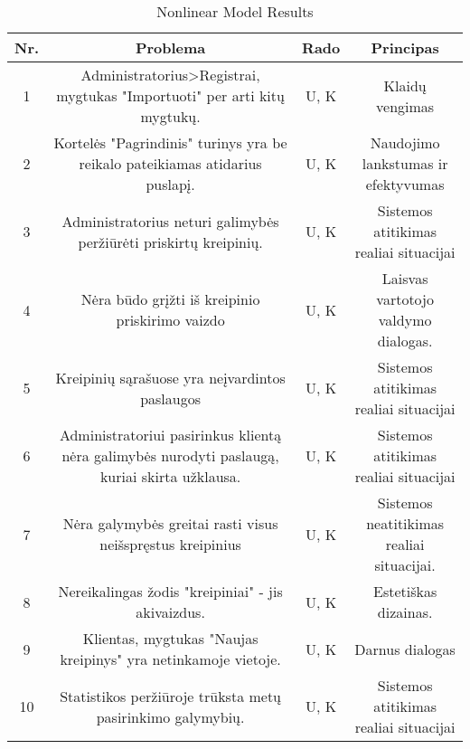 	\begin{table}[ht] 
	\caption{Nonlinear Model Results} %
	\centering %
	\begin{tabular}{c c c c} %
	\hline\hline %
	Nr. & Problema & Rado & Principas \\ [0.5ex] %
	\hline %
	1 & Administratorius>Registrai, mygtukas "Importuoti" per arti kitų mygtukų. & U, K & Klaidų vengimas \\ %
	2 & Kortelės "Pagrindinis" turinys yra be reikalo pateikiamas atidarius puslapį. & U, K & Naudojimo lankstumas ir efektyvumas \\
	3 & Administratorius neturi galimybės peržiūrėti priskirtų kreipinių. & U, K & Sistemos atitikimas realiai situacijai \\
	4 & Nėra būdo grįžti iš kreipinio priskirimo vaizdo & U, K & Laisvas vartotojo valdymo dialogas. \\
	5 & Kreipinių sąrašuose yra neįvardintos paslaugos & U, K & Sistemos atitikimas realiai situacijai \\
	6 & Administratoriui pasirinkus klientą nėra galimybės nurodyti paslaugą, kuriai skirta užklausa. & U, K & Sistemos atitikimas realiai situacijai \\
	7 & Nėra galymybės greitai rasti visus neišspręstus kreipinius & U, K & Sistemos neatitikimas realiai situacijai. \\
	8 & Nereikalingas žodis "kreipiniai" - jis akivaizdus. & U, K & Estetiškas dizainas. \\
	9 & Klientas, mygtukas "Naujas kreipinys" yra netinkamoje vietoje. & U, K & Darnus dialogas \\
	10 & Statistikos peržiūroje trūksta metų pasirinkimo galymybių. & U, K & Sistemos atitikimas realiai situacijai \\
	\hline %
	\end{tabular} 
	\label{table:nonlin} %
	\end{table} 

	